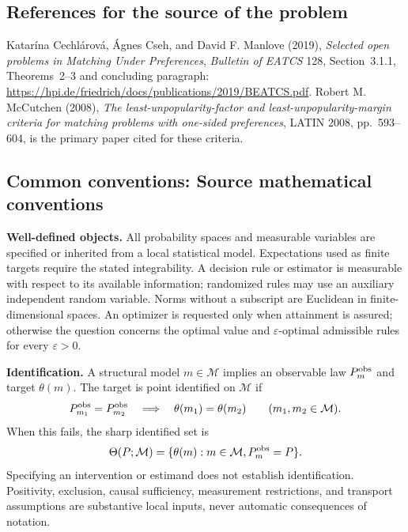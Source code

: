 \documentclass[11pt,a4paper]{article}
\begin{document}
\subsection*{References for the source of the problem}
Katar\'ina Cechl\'arov\'a, \'Agnes Cseh, and David F. Manlove (2019), \emph{Selected open problems in Matching Under Preferences}, \emph{Bulletin of EATCS} 128, Section~3.1.1, Theorems~2--3 and concluding paragraph: \url{https://hpi.de/friedrich/docs/publications/2019/BEATCS.pdf}. Robert M. McCutchen (2008), \emph{The least-unpopularity-factor and least-unpopularity-margin criteria for matching problems with one-sided preferences}, LATIN 2008, pp.~593--604, is the primary paper cited for these criteria.

\subsection*{Common conventions: Source mathematical conventions}

\textbf{Well-defined objects.}
All probability spaces and measurable variables are specified or inherited
from a local statistical model. Expectations used as finite targets require
the stated integrability. A decision rule or estimator is measurable with
respect to its available information; randomized rules may use an auxiliary
independent random variable. Norms without a subscript are Euclidean in
finite-dimensional spaces. An optimizer is requested only when attainment
is assured; otherwise the question concerns the optimal value and
$\varepsilon$-optimal admissible rules for every $\varepsilon>0$.

\textbf{Identification.}
A structural model $m\in\mathcal M$ implies an observable law
$P_m^{\rm obs}$ and target $\theta(m)$. The target is point identified on
$\mathcal M$ if
\[
 P_{m_1}^{\rm obs}=P_{m_2}^{\rm obs}
 \quad\Longrightarrow\quad\theta(m_1)=\theta(m_2)
 \qquad(m_1,m_2\in\mathcal M).
\]
When this fails, the sharp identified set is
\[
 \Theta(P;\mathcal M)=\{\theta(m):m\in\mathcal M,
                                  P_m^{\rm obs}=P\}.
\]
Specifying an intervention or estimand does not establish identification.
Positivity, exclusion, causal sufficiency, measurement restrictions, and
transport assumptions are substantive local inputs, never automatic
consequences of notation.
\end{document}
